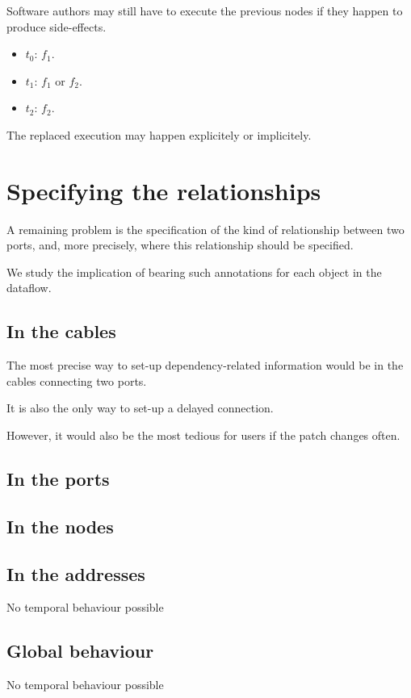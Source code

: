 \documentclass{article}
\begin{document}
    Software authors may still have to execute the previous nodes if they happen to produce side-effects.
    
    \begin{itemize}
        \item $t_0$: $f_1$.
        \item $t_1$: $f_1$ or $f_2$.
        \item $t_2$: $f_2$. 
    \end{itemize}

    The replaced execution may happen explicitely or implicitely.
    
    \section{Specifying the relationships}
    A remaining problem is the specification of the kind of relationship between two ports, and, more precisely, 
    where this relationship should be specified.
    
    We study the implication of bearing such annotations for each object in the dataflow.

    \subsection{In the cables}
    The most precise way to set-up dependency-related information would be in 
    the cables connecting two ports. 
    
    It is also the only way to set-up a delayed connection.
    
    However, it would also be the most tedious for users if the patch changes often.
    
    \subsection{In the ports}
    \subsection{In the nodes}
    \subsection{In the addresses}
    No temporal behaviour possible
    \subsection{Global behaviour}
    No temporal behaviour possible
\end{document}
